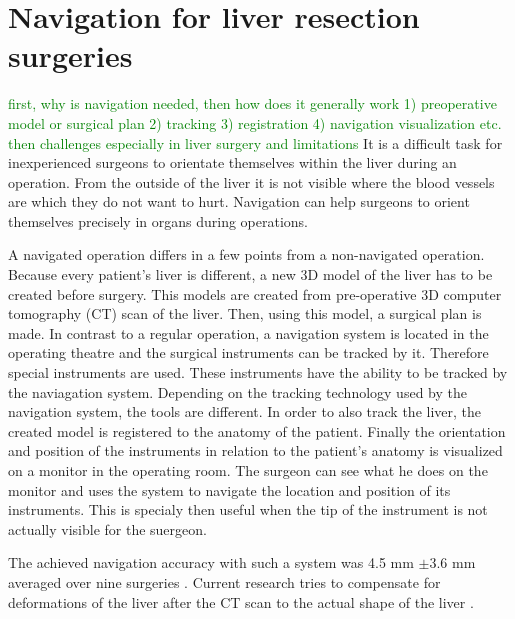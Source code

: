 \section{Navigation for liver resection surgeries}
\label{sec:navigationForLiverResections}
\textcolor{green}{first, why is navigation needed, then how does it generally work
  1) preoperative model or surgical plan 2) tracking 3) registration 4)
  navigation visualization etc. then challenges especially in liver surgery and limitations}
It is a difficult task for inexperienced surgeons to orientate themselves within the liver during an operation.
From the outside of the liver it is not visible where the blood vessels are which they do not want to hurt.
Navigation can help surgeons to orient themselves precisely in organs during
operations.

A navigated operation differs in a few points from a non-navigated operation.
Because every patient's liver is different, a new 3D model of the liver has to
be created before surgery. This models are created from pre-operative 3D
computer tomography (CT) scan of the liver. Then, using this model, a surgical plan is made.
In contrast to a regular operation, a navigation system is located in the
operating theatre and the surgical instruments can be tracked by it. Therefore special instruments are used. These
instruments have the ability to be tracked by the naviagation system. Depending
on the tracking technology used by the navigation system, the tools are different.
In order to also track the liver, the created model is registered to the anatomy
of the patient. Finally the orientation and position
of the instruments in relation to the patient's anatomy is visualized on a
monitor in the operating room. The surgeon can see what he does on the
monitor and uses the system to navigate the location and position of its
instruments. This is specialy then useful when the tip of the instrument is not
actually visible for the suergeon.

The achieved
navigation accuracy with such a system was 4.5 mm $\pm$3.6 mm averaged over nine surgeries \cite{peterhans2011navigation}.
Current research tries to compensate for deformations of the liver after the CT
scan to the actual shape of the liver \cite{clements2017deformation}
\cite{clements2015validation}. 
